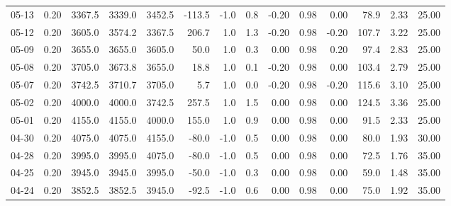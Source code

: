 \begin{threeparttable}
{\begin{tabular}{lrrrrrrrrrrrrr}
  05-13 &     0.20 & 3367.5 & 3339.0 & 3452.5 &     -113.5 &                     -1.0 &                 0.8 &      -0.20 &      0.98 &           0.00 &             78.9 &            2.33 &                  25.00 \\
  05-12 &     0.20 & 3605.0 & 3574.2 & 3367.5 &      206.7 &                      1.0 &                 1.3 &      -0.20 &      0.98 &          -0.20 &            107.7 &            3.22 &                  25.00 \\
  05-09 &     0.20 & 3655.0 & 3655.0 & 3605.0 &       50.0 &                      1.0 &                 0.3 &       0.00 &      0.98 &           0.20 &             97.4 &            2.83 &                  25.00 \\
  05-08 &     0.20 & 3705.0 & 3673.8 & 3655.0 &       18.8 &                      1.0 &                 0.1 &      -0.20 &      0.98 &           0.00 &            103.4 &            2.79 &                  25.00 \\
  05-07 &     0.20 & 3742.5 & 3710.7 & 3705.0 &        5.7 &                      1.0 &                 0.0 &      -0.20 &      0.98 &          -0.20 &            115.6 &            3.10 &                  25.00 \\
  05-02 &     0.20 & 4000.0 & 4000.0 & 3742.5 &      257.5 &                      1.0 &                 1.5 &       0.00 &      0.98 &           0.00 &            124.5 &            3.36 &                  25.00 \\
  05-01 &     0.20 & 4155.0 & 4155.0 & 4000.0 &      155.0 &                      1.0 &                 0.9 &       0.00 &      0.98 &           0.00 &             91.5 &            2.33 &                  25.00 \\
  04-30 &     0.20 & 4075.0 & 4075.0 & 4155.0 &      -80.0 &                     -1.0 &                 0.5 &       0.00 &      0.98 &           0.00 &             80.0 &            1.93 &                  30.00 \\
  04-28 &     0.20 & 3995.0 & 3995.0 & 4075.0 &      -80.0 &                     -1.0 &                 0.5 &       0.00 &      0.98 &           0.00 &             72.5 &            1.76 &                  35.00 \\
  04-25 &     0.20 & 3945.0 & 3945.0 & 3995.0 &      -50.0 &                     -1.0 &                 0.3 &       0.00 &      0.98 &           0.00 &             59.0 &            1.48 &                  35.00 \\
  04-24 &     0.20 & 3852.5 & 3852.5 & 3945.0 &      -92.5 &                     -1.0 &                 0.6 &       0.00 &      0.98 &           0.00 &             75.0 &            1.92 &                  35.00 \\

\end{tabular}}
\end{threeparttable}
